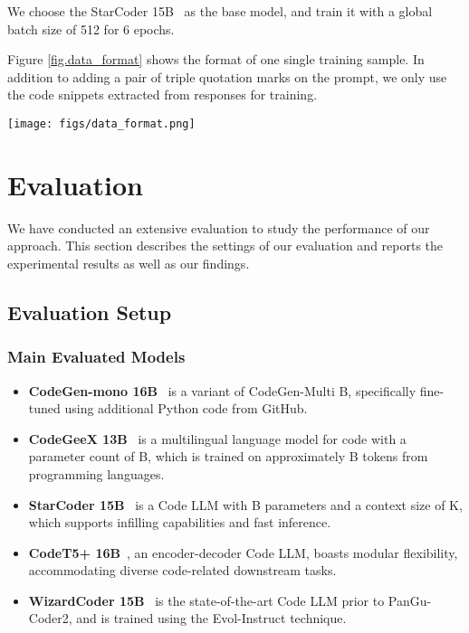 \documentclass{article}
\newcommand{\pgcoder}{PanGu-Coder2\xspace}
\begin{document}
We choose the StarCoder 15B~\cite{starcoder} as the base model, and train it with a global batch size of 512 for 6 epochs. 

Figure \ref{fig.data_format} shows the format of one single training sample. In addition to adding a pair of triple quotation marks on the prompt, we only use the code snippets extracted from responses for training.

\begin{figure*}[h]
  \centering
  \texttt{[image: figs/data\_format.png]}
  \caption{Example data format of the training sample.}
\label{fig.data_format}
\end{figure*}


\section{Evaluation}
\label{sec.exp}
We have conducted an extensive evaluation to study the performance of our approach. This section describes the settings of our evaluation and reports the experimental results as well as our findings.



\subsection{Evaluation Setup}

\subsubsection{Main Evaluated Models}

\begin{itemize}
    \item \textbf{CodeGen-mono 16B}~\cite{codegen} is a variant of CodeGen-Multi B, specifically fine-tuned using additional Python code from GitHub.
    \item \textbf{CodeGeeX 13B}~\cite{codegeex} is a multilingual language model for code with a parameter count of B, which is trained on approximately B tokens from  programming languages.
    \item \textbf{StarCoder 15B}~\cite{starcoder} is a Code LLM with B parameters and a context size of K, which supports infilling capabilities and fast inference.
    \item \textbf{CodeT5+ 16B}~\cite{codet5plus}, an encoder-decoder Code LLM, boasts modular flexibility, accommodating diverse code-related downstream tasks.
    \item \textbf{WizardCoder 15B}~\cite{wizardcoder} is the state-of-the-art Code LLM prior to \pgcoder, and is trained using the Evol-Instruct technique.
\end{itemize}
\end{document}

